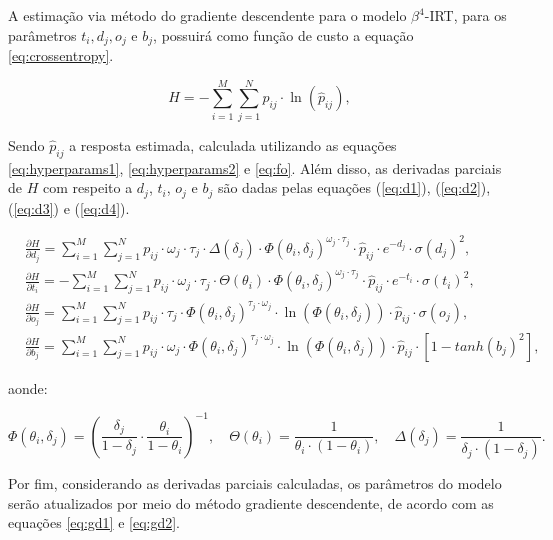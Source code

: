 A estimação via método do gradiente descendente para o modelo $\beta^{4}$-\gls{IRT}, para os parâmetros $t_i, d_j, o_j$ e $b_j$, possuirá como função de custo a equação \ref{eq:crossentropy}.

\begin{equation}
    \label{eq:crossentropy}
    H = -\sum_{i=1}^{M}\sum_{j=1}^{N} p_{ij}\cdot \ln(\hat{p}_{ij}),
\end{equation}

Sendo $\hat{p}_{ij}$ a resposta estimada, calculada utilizando as equações \ref{eq:hyperparams1}, \ref{eq:hyperparams2} e \ref{eq:fo}. Além disso, as derivadas parciais de $H$ com respeito a $d_j$, $t_i$,  $o_j$ e $b_j$ são dadas pelas equações  (\ref{eq:d1}), (\ref{eq:d2}), (\ref{eq:d3}) e (\ref{eq:d4}).

\begin{align}
    \label{eq:d1}
    &\frac{\partial H}{\partial d_j} =  \sum_{i=1}^{M}\sum_{j=1}^{N} p_{ij}\cdot \omega_j\cdot \tau_j \cdot \Delta(\delta_j) \cdot \Phi(\theta_i, \delta_j)^{\omega_j\cdot \tau_j} \cdot \hat{p}_{ij}\cdot e^{-d_j}\cdot \sigma(d_j)^{2},\\
    \label{eq:d2}
    &\frac{\partial H}{\partial t_i} = - \sum_{i=1}^{M}\sum_{j=1}^{N} p_{ij}\cdot \omega_j\cdot \tau_j \cdot \Theta(\theta_i) \cdot \Phi(\theta_i, \delta_j)^{\omega_j\cdot \tau_j} \cdot \hat{p}_{ij} \cdot e^{-t_i}\cdot \sigma(t_i)^{2},\\
    \label{eq:d3}
    &\frac{\partial H}{\partial o_j} =  \sum_{i=1}^{M}\sum_{j=1}^{N} p_{ij}\cdot \tau_j \cdot \Phi(\theta_i, \delta_j)^{\tau_j \cdot \omega_j} \cdot \ln(\Phi(\theta_i, \delta_j)) \cdot \hat{p}_{ij} \cdot \sigma(o_j),\\
    \label{eq:d4}
    &\frac{\partial H}{\partial b_j} =  \sum_{i=1}^{M}\sum_{j=1}^{N} p_{ij}\cdot \omega_j \cdot \Phi(\theta_i, \delta_j)^{\tau_j \cdot \omega_j} \cdot \ln(\Phi(\theta_i, \delta_j)) \cdot \hat{p}_{ij} \cdot [1 - tanh(b_j)^{2}],
\end{align}

\noindent aonde:

\begin{equation} \label{eq:summary_params}
    \Phi(\theta_i, \delta_j) = \left( \frac{\delta_j}{1 - \delta_j} \cdot \frac{\theta_i}{1 - \theta_i} \right)^{-1}, \quad 
    \Theta(\theta_i) = \frac{1}{\theta_i \cdot (1 - \theta_i)}, \quad 
    \Delta(\delta_j) = \frac{1}{\delta_j \cdot (1 - \delta_j)}.
\end{equation}


Por fim, considerando as derivadas parciais calculadas, os parâmetros do modelo serão atualizados por meio do método gradiente descendente, de acordo com as equações  \ref{eq:gd1} e \ref{eq:gd2}.

